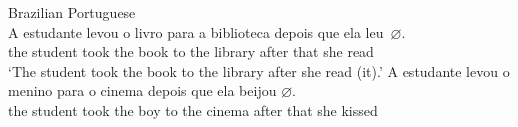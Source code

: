 \documentclass[output=paper]{langsci/langscibook}
\begin{document}
\ea\label{ex:key:27.1}Brazilian Portuguese\\
    \ea
        \gll    A    estudante levou    o     livro   para  a     biblioteca
        depois   que  ela    leu~\textbf{$\varnothing$}.\\
                the   student      took     the   book  to       the   library after     that  she    read {}\\
        \glt    `The student took the book to the library after she read (it).'
    \ex
        \gll \llap{*}A  estudante  levou     o     menino   para   o cinema depois  que ela   beijou \textbf{$\varnothing$}.\\
                the   student       took     the  boy         to       the cinema after     that   she   kissed\\
        \glt
    \z
\z
\end{document}
